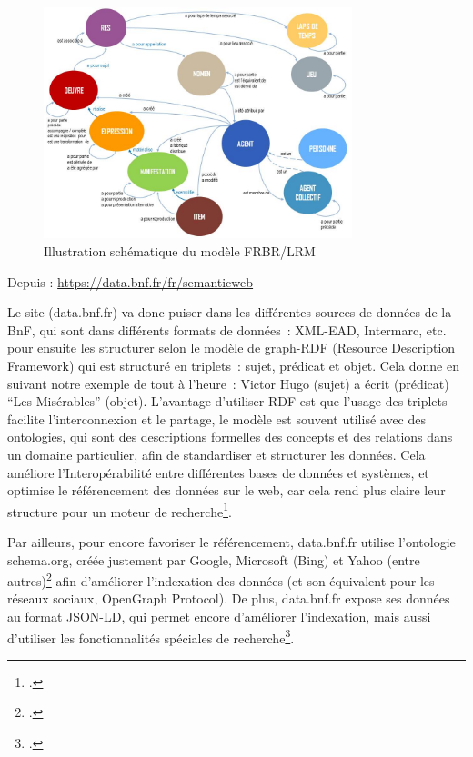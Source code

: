 \begin{figure}[h!]
	\centering
	\includegraphics[width=0.8\textwidth]{images/image3.jpg}
	\caption{Illustration schématique du modèle FRBR/LRM}
	\label{fig:image3}
\end{figure}

\begin{center}
	Depuis : \url{https://data.bnf.fr/fr/semanticweb}
\end{center}



Le site (data.bnf.fr) va donc puiser dans les différentes sources de données de la BnF, qui sont dans différents formats de données : XML-EAD, Intermarc, etc. pour ensuite les structurer selon le modèle de graph-RDF (Resource Description Framework) qui est structuré en triplets : sujet, prédicat et objet. Cela donne en suivant notre exemple de tout à l’heure : Victor Hugo (sujet) a écrit (prédicat) \enquote{Les Misérables} (objet). L’avantage d’utiliser RDF est que l’usage des triplets facilite l’interconnexion et le partage, le modèle est souvent utilisé avec des ontologies, qui sont des descriptions formelles des concepts et des relations dans un domaine particulier, afin de standardiser et structurer les données. Cela améliore l’Interopérabilité entre différentes bases de données et systèmes, et optimise le référencement des données sur le web, car cela rend plus claire leur structure pour un moteur de recherche\footcite{zotero-238}.

Par ailleurs, pour encore favoriser le référencement, data.bnf.fr utilise l’ontologie schema.org, créée justement par Google, Microsoft (Bing) et Yahoo (entre autres)\footcite{zotero-237} afin d’améliorer l’indexation des données (et son équivalent pour les réseaux sociaux, OpenGraph Protocol). De plus, data.bnf.fr expose ses données au format JSON-LD, qui permet encore d’améliorer l’indexation, mais aussi d’utiliser les fonctionnalités spéciales de recherche\footcite{zotero-236}.


